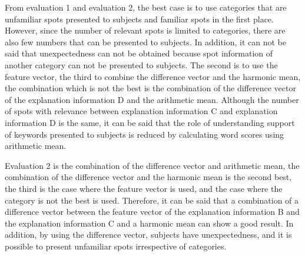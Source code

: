 \documentclass[journal]{IAENGtran}
\begin{document}
From evaluation 1 and evaluation 2, the best case is to use categories that are unfamiliar spots presented to subjects and familiar spots in the first place.
However, since the number of relevant spots is limited to categories, there are also few numbers that can be presented to subjects.
In addition, it can not be said that unexpectedness can not be obtained because spot information of another category can not be presented to subjects.
The second is to use the feature vector, the third to combine the difference vector and the harmonic mean, the combination which is not the best is the combination of the difference vector of the explanation information D and the arithmetic mean.
Although the number of spots with relevance between explanation information C and explanation information D is the same, it can be said that the role of understanding support of keywords presented to subjects is reduced by calculating word scores using arithmetic mean.

Evaluation 2 is the combination of the difference vector and arithmetic mean, the combination of the difference vector and the harmonic mean is the second best, the third is the case where the feature vector is used, and the case where the category is not the best is used.
Therefore, it can be said that a combination of a difference vector between the feature vector of the explanation information B and the explanation information C and a harmonic mean can show a good result.
In addition, by using the difference vector, subjects have unexpectedness, and it is possible to present unfamiliar spots irrespective of categories.
\end{document}
